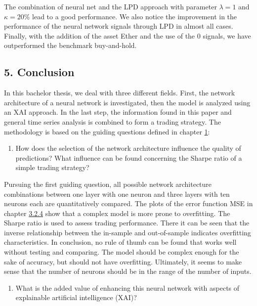 \documentclass[
]{article}
\providecommand{\tightlist}{%
  \setlength{\itemsep}{0pt}\setlength{\parskip}{0pt}}
\begin{document}
The combination of neural net and the LPD approach with parameter
\(\lambda=1\) and \(\kappa = 20 \%\) lead to a good performance. We also
notice the improvement in the performance of the neural network signals
through LPD in almost all cases. Finally, with the addition of the asset
Ether and the use of the 0 signals, we have outperformed the benchmark
buy-and-hold.

\newpage

\hypertarget{conclusion}{%
\subsection{5. Conclusion}\label{conclusion}}

In this bachelor thesis, we deal with three different fields. First, the
network architecture of a neural network is investigated, then the model
is analyzed using an XAI approach. In the last step, the information
found in this paper and general time series analysis is combined to form
a trading strategy. The methodology is based on the guiding questions
defined in chapter \protect\hyperlink{introduction}{1}:

\begin{enumerate}
\def\labelenumi{\arabic{enumi})}
\tightlist
\item
  How does the selection of the network architecture influence the
  quality of predictions? What influence can be found concerning the
  Sharpe ratio of a simple trading strategy?
\end{enumerate}

Pursuing the first guiding question, all possible network architecture
combinations between one layer with one neuron and three layers with ten
neurons each are quantitatively compared. The plots of the error
function MSE in chapter \protect\hyperlink{evaluate_nn}{3.2.4} show that
a complex model is more prone to overfitting. The Sharpe ratio is used
to assess trading performance. There it can be seen that the inverse
relationship between the in-sample and out-of-sample indicates
overfitting characteristics. In conclusion, no rule of thumb can be
found that works well without testing and comparing. The model should be
complex enough for the sake of accuracy, but should not have
overfitting. Ultimately, it seems to make sense that the number of
neurons should be in the range of the number of inputs.

\begin{enumerate}
\def\labelenumi{\arabic{enumi})}
\setcounter{enumi}{1}
\tightlist
\item
  What is the added value of enhancing this neural network with aspects
  of explainable artificial intelligence (XAI)?
\end{enumerate}
\end{document}
